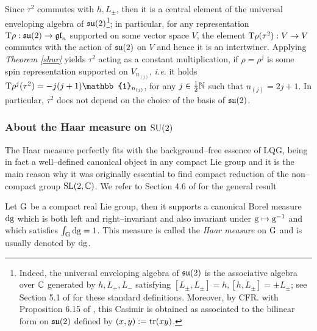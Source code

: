 {
\begin{remark}\label{Casimir}
Since $\tau^2$ commutes with $h,L_\pm$, then it is a central element of the universal enveloping algebra of $\mathfrak{su}(2)$\footnote{Indeed, the universal enveloping algebra of $\mathfrak{su}(2)$ is the associative algebra over $\mathbb{C}$ generated by ${h,L_+,L_-}$ satisfying $[L_\pm,L_\pm]=h, [h,L_\pm]=\pm L_\pm$; see Section 5.1 of \cite{kirillov} for these standard definitions. Moreover, by CFR. with Proposition 6.15 of \cite{kirillov}, this Casimir is obtained as associated to the bilinear form on $\mathfrak{su}(2)$ defined by $(x,y):=\text{\normalfont tr}(xy)$.}; in particular, for any representation $\text{\normalfont T}\rho:\mathfrak{su}(2)\to\mathfrak{gl}_n$ supported on some vector space $V$, the element $\text{\normalfont T}\rho(\tau^2):V\to V$ commutes with the action of $\mathfrak{su}(2)$ on $V$ and hence it is an intertwiner. Applying \emph{Theorem \ref{shur}} yields $\tau^2$ acting as a constant multiplication, if $\rho=\rho^j$ is some spin representation supported on $V_{n_{(j)}}$, \emph{i.e.} it holds $\T\rho^j(\tau^2)=-j(j+1)\mathbb{1}_{n_{(j)}}$, for any $j\in\frac{1}{2}\mathbb{N}$ such that $n_{(j)}=2j+1$. In particular, $\tau^2$ does not depend on the choice of the basis of $\mathfrak{su}(2)$.
\end{remark}
}





\subsubsection{About the Haar measure on \texorpdfstring{$\text{\normalfont SU}(2)$}{a}}
The Haar measure perfectly fits with the background--free essence of LQG, being in fact a well--defined canonical object in any compact Lie group and it is the main reason why it was originally essential to find compact reduction of the non--compact group $\text{\normalfont SL}(2,\mathbb{C})$. %
We refer to Section 4.6 of \cite{kirillov} for the general result
\begin{teo}[Haar]
    Let $\text{\normalfont G}$ be a compact real Lie group, then it supports a canonical Borel measure $\text{\normalfont d}\text{\normalfont g}$ which is both left and right--invariant and also invariant under $\text{\normalfont g}\mapsto\text{\normalfont g}^{-1}$ and which satisfies $\int_{\text{\normalfont G}}\text{\normalfont d}\text{\normalfont g}=1$. This measure is called the \emph{Haar measure} on $\text{\normalfont G}$ and is usually denoted by $\text{\normalfont d}\text{\normalfont g}$.
\end{teo}

